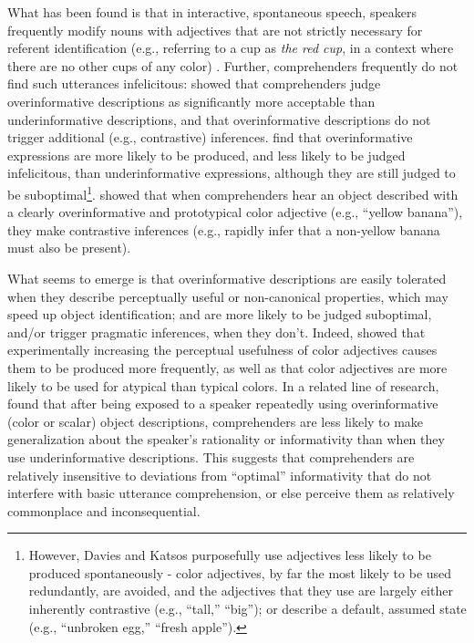 What has been found is that in interactive, spontaneous speech, speakers
frequently modify nouns with adjectives that are not strictly necessary
for referent identification (e.g., referring to a cup as \emph{the red
cup}, in a context where there are no other cups of any color)
\citep[][: 30\% and 50\% of nominal descriptions were overspecified in spontaneous speech,
respectively]{Engelhardt2006, Nadig2002}. Further, comprehenders frequently do not find such
utterances infelicitous: \citet{Engelhardt2006} showed that
comprehenders judge overinformative descriptions as significantly more
acceptable than underinformative descriptions, and that overinformative
descriptions do not trigger additional (e.g., contrastive) inferences.
\citet{Davies2010} find that overinformative expressions are more
likely to be produced, and less likely to be judged infelicitous, than
underinformative expressions, although they are still judged to be
suboptimal\footnote{However, Davies and Katsos purposefully use
  adjectives less likely to be produced spontaneously - color
  adjectives, by far the most likely to be used redundantly, are
  avoided, and the adjectives that they use are largely either
  inherently contrastive (e.g., \enquote{tall,} \enquote{big}); or
  describe a default, assumed state (e.g., \enquote{unbroken egg,}
  \enquote{fresh apple}).}. \citet{Sedivy2003} showed that when comprehenders
hear an object described with a clearly overinformative and prototypical
color adjective (e.g., \enquote{yellow banana}), they make contrastive
inferences (e.g., rapidly infer that a non-yellow banana must also be
present).

What seems to emerge is that overinformative descriptions are easily
tolerated when they describe perceptually useful or non-canonical
properties, which may speed up object identification; and are more
likely to be judged suboptimal, and/or trigger pragmatic inferences,
when they don't. Indeed, \citet{RubioFernandez2016} showed that
experimentally increasing the perceptual usefulness of color adjectives
causes them to be produced more frequently, as well as that color
adjectives are more likely to be used for atypical than typical colors.
In a related line of research, \citet{Pogue2016} found that after
being exposed to a speaker repeatedly using overinformative (color or
scalar) object descriptions, comprehenders are less likely to make
generalization about the speaker's rationality or informativity than
when they use underinformative descriptions. This suggests that
comprehenders are relatively insensitive to deviations from
\enquote{optimal} informativity that do not interfere with basic
utterance comprehension, or else perceive them as relatively commonplace
and inconsequential.

